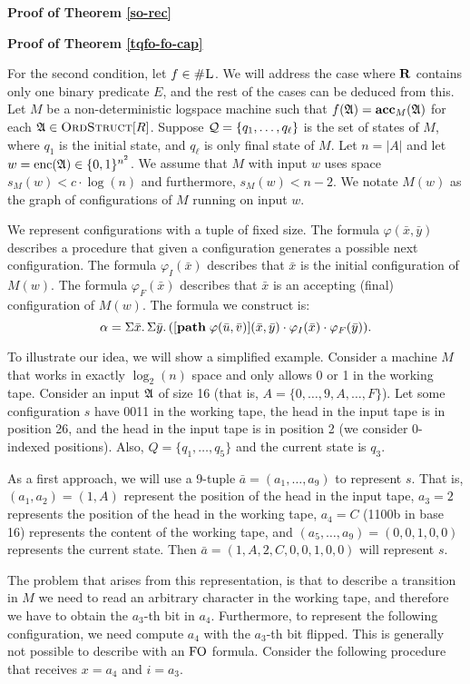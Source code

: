 


\textbf{Proof of Theorem \ref{so-rec}}


\textbf{Proof of Theorem \ref{tqfo-fo-cap}}

For the second condition, let $f \in \text{\sc \#L}$. We will address the case where $\mathbf{R}$ contains only one binary predicate $E$, and the rest of the cases can be deduced from this. Let $M$ be a non-deterministic logspace machine such that $f(\mathfrak{A}) = \textbf{acc}_M(\mathfrak{A})$ for each $\mathfrak{A} \in \text{\sc OrdStruct}[R]$. Suppose ${\cal Q} = \{q_1,\ldots,q_{\ell}\}$ is the set of states of $M$, where $q_1$ is the initial state, and $q_{\ell}$ is only final state of $M$. Let $n = \vert A \vert$ and let $w = {\rm enc}(\mathfrak{A}) \in \{0,1\}^{n^2}$. We assume that $M$ with input $w$ uses space $s_M(w) < c\cdot\log(n)$ and furthermore, $s_M(w) < n-2$. We notate $M(w)$ as the graph of configurations of $M$ running on input $w$.

We represent configurations with a tuple of fixed size. The formula $\varphi(\bar{x},\bar{y})$ describes a procedure that given a configuration generates a possible next configuration. The formula $\varphi_I(\bar{x})$ describes that $\bar{x}$ is the initial configuration of $M(w)$. The formula $\varphi_F(\bar{x})$ describes that $\bar{x}$ is an accepting (final) configuration of $M(w)$. The formula we construct is:
$$
\alpha = \Sigma{\bar{x}}.\,\Sigma{\bar{y}}.\,([{\bf path} \; \varphi(\bar{u},\bar{v})](\bar{x},\bar{y})\cdot \varphi_I(\bar{x})\cdot\varphi_F(\bar{y})).
$$

To illustrate our idea, we will show a simplified example. Consider a machine $M$ that works in exactly $\log_2(n)$ space and only allows 0 or 1 in the working tape. Consider an input $\mathfrak{A}$ of size 16 (that is, $A = \{0,\ldots,9,A,\ldots,F\}$). Let some configuration $s$ have 0011 in the working tape, the head in the input tape is in position 26, and the head in the input tape is in position 2 (we consider 0-indexed positions). Also, $Q = \{q_1,\ldots,q_5\}$ and the current state is $q_3$.

As a first approach, we will use a 9-tuple $\bar{a} = (a_1,\ldots,a_9)$ to represent $s$. That is, $(a_1,a_2) = (1,A)$ represent the position of the head in the input tape, $a_3 = 2$ represents the position of the head in the working tape, $a_4 = C$ (1100b in base 16) represents the content of the working tape, and $(a_5,\ldots,a_9) = (0,0,1,0,0)$ represents the current state. Then $\bar{a} = (1,A,2,C,0,0,1,0,0)$ will represent $s$.

The problem that arises from this representation, is that to describe a transition in $M$ we need to read an arbitrary character in the working tape, and therefore we have to obtain the $a_3$-th bit in $a_4$. Furthermore, to represent the following configuration, we need compute $a_4$ with the $a_3$-th bit flipped. This is generally not possible to describe with an ${\rm FO}$ formula. Consider the following procedure that receives $x = a_4$ and $i = a_3$.

